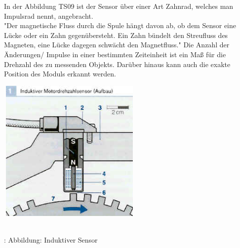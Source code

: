 \documentclass{article}
\begin{document}
			
				\begin{flushleft}
					In der Abbildung TS09 ist der Sensor über einer Art Zahnrad, welches man Impulsrad nennt, angebracht.\\
					"Der magnetische Fluss durch die Spule hängt davon ab, ob dem Sensor eine Lücke oder ein Zahn gegenübersteht. Ein Zahn bündelt den Streufluss des Magneten, eine Lücke dagegen schwächt den Magnetfluss." \cite{TS08}  
					Die Anzahl der Änderungen/ Impulse in einer bestimmten Zeiteinheit ist ein Maß für die Drehzahl des zu messenden Objekts. Darüber hinaus kann auch die exakte Position des Moduls erkannt werden.\\						
				\end{flushleft}
			
			
		
				\begin{center}
					\includegraphics[width=7cm, height=7cm] {Images/Kapitel5/aufbau_induktiv.png}
					\caption{\\\cite{TS09}: Abbildung: Induktiver Sensor}
				\end{center}
				
\end{document}
